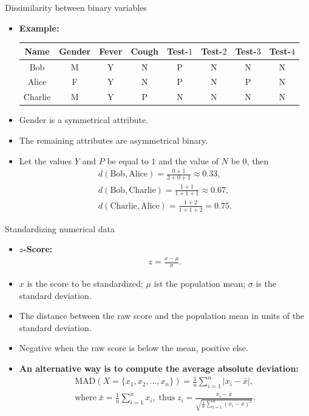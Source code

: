 \documentclass[aspectratio=169,t]{beamer}
\begin{document}
  { 
    \begin{frame}{Dissimilarity between binary variables}
    \begin{itemize}
        \item \textbf{Example:}\;
        \begin{tabular}{| c | c | c | c | c | c | c | c |}
        \hline
        Name & Gender & Fever & Cough & Test-$1$ & Test-$2$ & Test-$3$ & Test-$4$\\\hline
        Bob & M & Y & N & P & N & N & N \\
        Alice & F & Y & N & P & N & P & N \\
        Charlie & M & Y & P & N & N & N & N \\\hline
        \end{tabular}
        \item Gender is a symmetrical attribute.
        \item The remaining attributes are asymmetrical binary.
        \item Let the values $Y$ and $P$ be equal to $1$ and the value of $N$ be $0$, then
        \begin{align}
          d(\text{Bob}, \text{Alice}) = \frac{0+1}{2+0+1} \approx 0.33,\\
          d(\text{Bob}, \text{Charlie}) = \frac{1+1}{1+1+1} \approx 0.67,\\
          d(\text{Charlie}, \text{Alice}) = \frac{1+2}{1+1+2} = 0.75.
        \end{align}
    \end{itemize}
    \end{frame}
  }

  { 
    \begin{frame}{Standardizing numerical data}
    \begin{itemize}
      \item \textbf{$z$-Score:}
            \begin{align}
              z = \frac{x-\mu}{\sigma}.
            \end{align}
      \item $x$ is the score to be standardized; $\mu$ ist the population mean; $\sigma$ is the standard deviation.
      \item The distance between the raw score and the population mean in units of the standard deviation.
      \item Negative when the raw score is below the mean, positive else.
      \item \textbf{An alternative way is to compute the average absolute deviation:}
      \begin{align}
      \text{MAD}(X = \{x_1,x_2,\ldots,x_n\}) = \frac{1}{n} \sum_{i=1}^{n} \vert x_i - \bar{x} \vert,\\
      \text{where} \; \bar{x} = \frac{1}{n} \sum_{i=1}^{n}x_i, \; \text{thus} \; z_i = \frac{x_i-\bar{x}}{\sqrt{\frac{1}{n}\sum_{i=1}^{n}(x_i-\bar{x})^2}}.
      \end{align}
    \end{itemize}
    \end{frame}
  }
\end{document}

